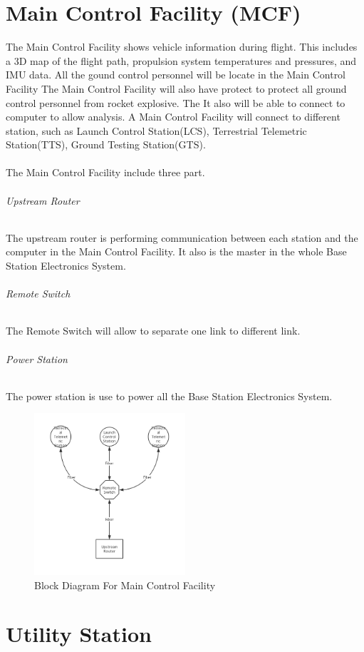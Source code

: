 \documentclass[12pt,article]{memoir}
\begin{document}
\chapter{Main Control Facility (MCF)}
The Main Control Facility shows vehicle information during flight. This includes a 3D map of the flight path, propulsion system temperatures and pressures, and IMU data. All the gound control personnel will be locate in the Main Control Facility The Main Control Facility will also have protect to protect all ground control personnel from rocket explosive. The  It also will be able to connect to computer to allow analysis. A Main Control Facility will connect to different station, such as Launch Control Station(LCS), Terrestrial Telemetric Station(TTS), Ground Testing Station(GTS).\\\\
The Main Control Facility include three part.
\subparagraph{Upstream Router}
The upstream router is performing communication between each station and the computer in the Main Control Facility. It also is the master in the whole Base Station Electronics System.
\subparagraph{Remote Switch}
The Remote Switch will allow to separate one link to different link.
\subparagraph{Power Station} The power station is use to power all the Base Station Electronics System.
\\
\begin{figure}[htp]
\begin{center}
\includegraphics[width=0.5\textwidth]{img/ES00004_MCF.png}
 \caption{Block Diagram For Main Control Facility}	
\end{center}
\end{figure}
\newpage
\newpage
\chapter{Utility Station}
\end{document}
